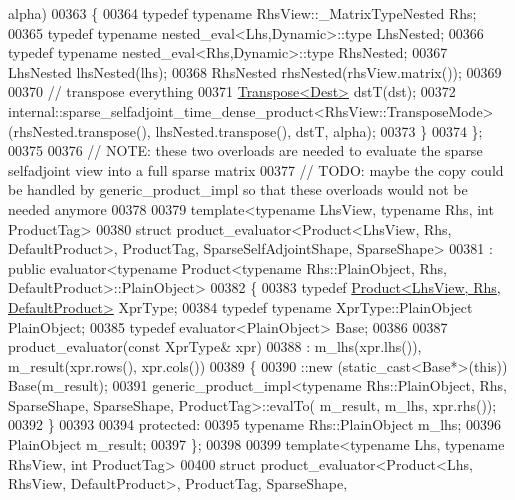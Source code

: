 \begin{DoxyCode}
       alpha)
00363   \{
00364     \textcolor{keyword}{typedef} \textcolor{keyword}{typename} RhsView::\_MatrixTypeNested Rhs;
00365     \textcolor{keyword}{typedef} \textcolor{keyword}{typename} nested\_eval<Lhs,Dynamic>::type LhsNested;
00366     \textcolor{keyword}{typedef} \textcolor{keyword}{typename} nested\_eval<Rhs,Dynamic>::type RhsNested;
00367     LhsNested lhsNested(lhs);
00368     RhsNested rhsNested(rhsView.matrix());
00369     
00370     \textcolor{comment}{// transpose everything}
00371     \hyperlink{group___core___module_class_eigen_1_1_transpose}{Transpose<Dest>} dstT(dst);
00372     internal::sparse\_selfadjoint\_time\_dense\_product<RhsView::TransposeMode>(rhsNested.transpose(), 
      lhsNested.transpose(), dstT, alpha);
00373   \}
00374 \};
00375 
00376 \textcolor{comment}{// NOTE: these two overloads are needed to evaluate the sparse selfadjoint view into a full sparse matrix}
00377 \textcolor{comment}{// TODO: maybe the copy could be handled by generic\_product\_impl so that these overloads would not be
       needed anymore}
00378 
00379 \textcolor{keyword}{template}<\textcolor{keyword}{typename} LhsView, \textcolor{keyword}{typename} Rhs, \textcolor{keywordtype}{int} ProductTag>
00380 \textcolor{keyword}{struct }product\_evaluator<Product<LhsView, Rhs, DefaultProduct>, ProductTag, SparseSelfAdjointShape, 
      SparseShape>
00381   : \textcolor{keyword}{public} evaluator<typename Product<typename Rhs::PlainObject, Rhs, DefaultProduct>::PlainObject>
00382 \{
00383   \textcolor{keyword}{typedef} \hyperlink{group___core___module_class_eigen_1_1_product}{Product<LhsView, Rhs, DefaultProduct>} XprType;
00384   \textcolor{keyword}{typedef} \textcolor{keyword}{typename} XprType::PlainObject PlainObject;
00385   \textcolor{keyword}{typedef} evaluator<PlainObject> Base;
00386 
00387   product\_evaluator(\textcolor{keyword}{const} XprType& xpr)
00388     : m\_lhs(xpr.lhs()), m\_result(xpr.rows(), xpr.cols())
00389   \{
00390     ::new (static\_cast<Base*>(\textcolor{keyword}{this})) Base(m\_result);
00391     generic\_product\_impl<typename Rhs::PlainObject, Rhs, SparseShape, SparseShape, ProductTag>::evalTo(
      m\_result, m\_lhs, xpr.rhs());
00392   \}
00393   
00394 \textcolor{keyword}{protected}:
00395   \textcolor{keyword}{typename} Rhs::PlainObject m\_lhs;
00396   PlainObject m\_result;
00397 \};
00398 
00399 \textcolor{keyword}{template}<\textcolor{keyword}{typename} Lhs, \textcolor{keyword}{typename} RhsView, \textcolor{keywordtype}{int} ProductTag>
00400 \textcolor{keyword}{struct }product\_evaluator<Product<Lhs, RhsView, DefaultProduct>, ProductTag, SparseShape, 

\end{DoxyCode}
